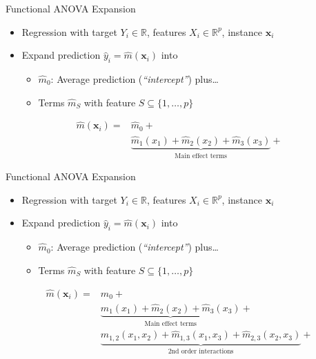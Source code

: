 \documentclass[aspectratio=169,12pt]{beamer}
\providecommand{\tightlist}{%
  \setlength{\itemsep}{2pt}\setlength{\parskip}{0pt}}
\begin{document}
\begin{frame}{Functional ANOVA Expansion}
\label{functional-anova-expansion}
\begin{itemize}[<+->]
\tightlist
\item
  Regression with target \(Y_i \in \mathbb{R}\), features
  \(X_i \in \mathbb{R}^p\), instance \(\mathbf{x}_i\)
\item
  Expand prediction \(\hat{y}_i = \hat{m}(\mathbf{x}_i)\) into

  \begin{itemize}[<+->]
  \tightlist
  \item
    \(\hat{m}_{0}\): Average prediction (\emph{``intercept''})
    plus\ldots{}
  \item
    Terms \(\hat{m}_S\) with feature \(S \subseteq \{1, \ldots, p\}\)
  \end{itemize}
\end{itemize}

\pause

\vfill

\begin{align*}
\hat{m}(\mathbf{x}_i) = & \hat{m}_{0} + \\
&  \underbrace{\hat{m}_1(x_1) + \hat{m}_2(x_2) + \hat{m}_3(x_3)}_{\text{Main effect terms}} +
\end{align*}

\vfill
\end{frame}

\begin{frame}{Functional ANOVA Expansion}
\label{functional-anova-expansion-1}
\begin{itemize}
\tightlist
\item
  Regression with target \(Y_i \in \mathbb{R}\), features
  \(X_i \in \mathbb{R}^p\), instance \(\mathbf{x}_i\)
\item
  Expand prediction \(\hat{y}_i = \hat{m}(\mathbf{x}_i)\) into

  \begin{itemize}
  \tightlist
  \item
    \(\hat{m}_{0}\): Average prediction (\emph{``intercept''})
    plus\ldots{}
  \item
    Terms \(\hat{m}_S\) with feature \(S \subseteq \{1, \ldots, p\}\)
  \end{itemize}
\end{itemize}

\vfill

\begin{align*}
\hat{m}(\mathbf{x}_i) = & \hat{m}_{0} + \\
&  \underbrace{\hat{m}_1(x_1) + \hat{m}_2(x_2) + \hat{m}_3(x_3)}_{\text{Main effect terms}} + \\
&  \underbrace{\hat{m}_{1,2}(x_1,x_2) + \hat{m}_{1,3}(x_1,x_3) + \hat{m}_{2,3}(x_2,x_3)}_{\text{2nd order interactions}} +
\end{align*}

\vfill
\end{frame}
\end{document}
